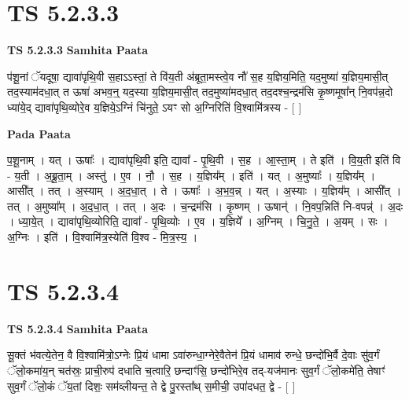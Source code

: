\documentclass[17pt]{extarticle}
\begin{document}

\section{ TS 5.2.3.3 }

\textbf{TS 5.2.3.3 } \newline
\textbf{Samhita Paata} \newline

प॑शू॒नां ॅयदूषा॒ द्यावा॑पृथि॒वी स॒हाऽऽस्तां॒ ते वि॑य॒ती अ॑ब्रूता॒मस्त्वे॒व नौ॑ स॒ह य॒ज्ञिय॒मिति॒ यद॒मुष्या॑ य॒ज्ञिय॒मासी॒त् तद॒स्याम॑दधा॒त् त ऊषा॑ अभव॒न्॒ यद॒स्या य॒ज्ञिय॒मासी॒त् तद॒मुष्या॑मदधा॒त् तद॒दश्च॒न्द्रम॑सि कृ॒ष्णमूषा᳚न् नि॒वप॑न्न॒दो ध्या॑ये॒द् द्यावा॑पृथि॒व्योरे॒व य॒ज्ञिये॒ऽग्निं चि॑नुते॒ ऽयꣳ सो अ॒ग्निरिति॑ वि॒श्वामि॑त्रस्य - [  ] \newline

\textbf{Pada Paata} \newline

प॒शू॒नाम् । यत् । ऊषाः᳚ । द्यावा॑पृथि॒वी इति॒ द्यावा᳚ - पृ॒थि॒वी । स॒ह । आ॒स्ता॒म् । ते इति॑ । वि॒य॒ती इति॑ वि - य॒ती । अ॒ब्रू॒ता॒म् । अस्तु॑ । ए॒व । नौ॒ । स॒ह । य॒ज्ञिय᳚म् । इति॑ । यत् । अ॒मुष्याः᳚ । य॒ज्ञिय᳚म् । आसी᳚त् । तत् । अ॒स्याम् । अ॒द॒धा॒त् । ते । ऊषाः᳚ । अ॒भ॒व॒न्न् । यत् । अ॒स्याः । य॒ज्ञिय᳚म् । आसी᳚त् । तत् । अ॒मुष्या᳚म् । अ॒द॒धा॒त् । तत् । अ॒दः । च॒न्द्रम॑सि । कृ॒ष्णम् । ऊषान्॑ । नि॒वप॒न्निति॑ नि-वपन्न्॑ । अ॒दः । ध्या॒ये॒त् । द्यावा॑पृथि॒व्योरिति॒ द्यावा᳚ - पृ॒थि॒व्योः । ए॒व । य॒ज्ञिये᳚ । अ॒ग्निम् । चि॒नु॒ते॒ । अ॒यम् । सः । अ॒ग्निः । इति॑ । वि॒श्वामि॑त्र॒स्येति॑ वि॒श्व - मि॒त्र॒स्य॒ ।  \newline





\section{ TS 5.2.3.4 }

\textbf{TS 5.2.3.4 } \newline
\textbf{Samhita Paata} \newline

सू॒क्तं भ॑वत्ये॒तेन॒ वै वि॒श्वामि॑त्रो॒ऽग्नेः प्रि॒यं धामा ऽवा॑रुन्धा॒ग्नेरे॒वैतेन॑ प्रि॒यं धामाव॑ रुन्धे॒ छन्दो॑भि॒र्वै दे॒वाः सु॑व॒र्गं ॅलो॒कमा॑य॒न् चत॑स्रः॒ प्राची॒रुप॑ दधाति च॒त्वारि॒ छन्दाꣳ॑सि॒ छन्दो॑भिरे॒व तद्-यज॑मानः सुव॒र्गं ॅलो॒कमे॑ति॒ तेषाꣳ॑ सुव॒र्गं ॅलो॒कं ॅय॒तां दिशः॒ सम॑व्लीयन्त॒ ते द्वे पु॒रस्ता᳚थ् स॒मीची॒ उपा॑दधत॒ द्वे - [  ] \newline
\end{document}
